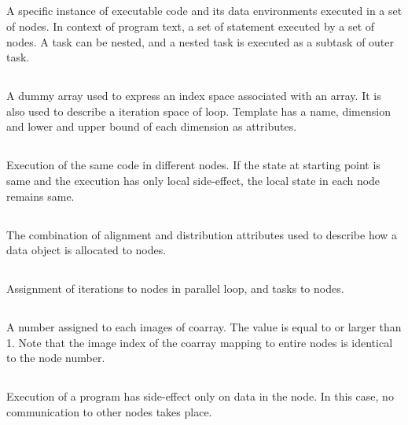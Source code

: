\subsection*{}
A specific instance of executable code and
its data environments executed in a set of nodes. In context of
program text, a set of statement executed by a set of nodes. A task
can be nested, and a nested task is executed as a subtask of outer
task.

\subsection*{}
A dummy array used to express an index space associated
with an array. It is also used to describe a iteration space of
loop. Template has a name, dimension and lower and upper bound of each
dimension as attributes.

\subsection*{}
Execution of the same
code in different nodes. If the state at starting point is same and
the execution has only local side-effect, the local state in each node
remains same. 

\subsection*{}
The combination of alignment and
distribution attributes used to describe how a data object is
allocated to nodes.

\subsection*{}
Assignment of iterations to nodes in
parallel loop, and tasks to nodes.

\subsection*{}
A number assigned to
each images of coarray. The value is equal to or larger than 1. 
Note that the image index of the coarray mapping to entire nodes is
identical to the node number.

\subsection*{}
Execution of a program has
side-effect only on data in the node. In this case, no communication
to other nodes takes place. 


